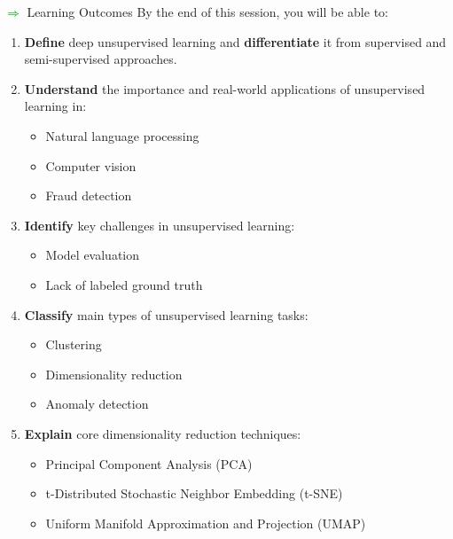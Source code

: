 \begin{frame}[allowframebreaks]{\textcolor{green}{$\Rightarrow$} Learning Outcomes}
    By the end of this session, you will be able to:
    \begin{enumerate}
        \item \textbf{Define} deep unsupervised learning and \textbf{differentiate} it from supervised and semi-supervised approaches.
        \item \textbf{Understand} the importance and real-world applications of unsupervised learning in:
        \begin{itemize}
            \item Natural language processing
            \item Computer vision
            \item Fraud detection
        \end{itemize}
        \item \textbf{Identify} key challenges in unsupervised learning:
        \begin{itemize}
            \item Model evaluation
            \item Lack of labeled ground truth
        \end{itemize}

        \framebreak

        \item \textbf{Classify} main types of unsupervised learning tasks:
        \begin{itemize}
            \item Clustering
            \item Dimensionality reduction
            \item Anomaly detection
        \end{itemize}
        \item \textbf{Explain} core dimensionality reduction techniques:
        \begin{itemize}
            \item Principal Component Analysis (PCA)
            \item t-Distributed Stochastic Neighbor Embedding (t-SNE)
            \item Uniform Manifold Approximation and Projection (UMAP)
        \end{itemize}
    \end{enumerate}
\end{frame}